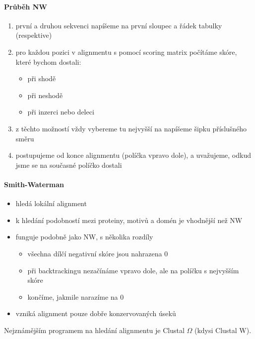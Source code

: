 \documentclass[DIV=8]{scrreprt}
\begin{document}
\paragraph{Průběh NW}
\begin{enumerate}[nosep]
    \item první a druhou sekvenci napíšeme na první sloupec a řádek tabulky (respektive)
    \item pro každou pozici v alignmentu s pomocí scoring matrix počítáme skóre, které bychom dostali:
\begin{itemize}[nosep]
    \item při shodě
    \item při neshodě
    \item při inzerci nebo deleci
\end{itemize}

    \item z těchto možností vždy vybereme tu nejvyšší na napíšeme šipku příslušného směru
    \item postupujeme od konce alignmentu (políčka vpravo dole), a uvažujeme, odkud jsme se na současné políčko dostali
\end{enumerate}



\paragraph{Smith-Waterman}
\begin{itemize}[nosep]
    \item hledá lokální alignment
    \item k hledání podobností mezi proteiny, motivů a domén je vhodnější než NW
    \item funguje podobně jako NW, s několika rozdíly
\begin{itemize}[nosep]
    \item všechna dílčí negativní skóre jsou nahrazena 0
    \item při backtrackingu nezačínáme vpravo dole, ale na políčku s nejvyšším skóre
    \item končíme, jakmile narazíme na 0
\end{itemize}

    \item vzniká alignment pouze dobře konzervovaných úseků
\end{itemize}



Nejznámějším programem na hledání alignmentu je Clustal \(\Omega\) (kdysi Clustal W).
\end{document}

